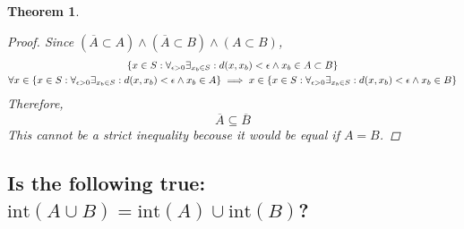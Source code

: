 \documentclass[]{article}
\newtheorem{theorem}{Theorem}
\begin{document}
\begin{theorem}
\begin{proof}
        Since $(\overline{A} \subset A) \land (\overline{A} \subset B) \land (A \subset B)$,
        \begin{gather*}
            \qty{x \in S : 
                \forall_{\epsilon> 0} \exists_{x_b \in S} : d(x,x_b) < \epsilon 
                \land x_b \in A \subset B}\\
            \forall x \in \qty{x \in S : 
                \forall_{\epsilon> 0} \exists_{x_b \in S} : d(x,x_b) < \epsilon 
                    \land x_b \in A}
                \implies x \in \qty{x \in S : 
                    \forall_{\epsilon> 0} \exists_{x_b \in S} : d(x,x_b) < \epsilon 
                        \land x_b \in B}
        \end{gather*}
        Therefore,
        $$\overline{A} \subseteq \overline{B}$$
        This cannot be a strict inequality becouse it would be equal if $A = B$.
    \end{proof}
\end{theorem}

\newpage
\subsection{Is the following true:
$\text{int}(A\cup B) = \text{int}(A) \cup \text{int}(B)$?}
\end{document}
